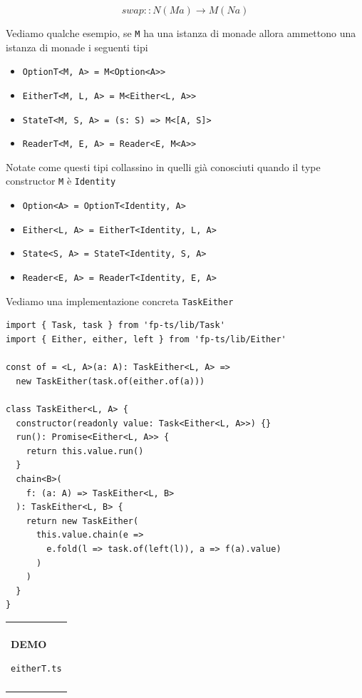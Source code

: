 \documentclass[12pt]{article}
\newenvironment{demo}
    {\begin{center}
    \begin{tabular}{|p{0.9\textwidth}|}
    \hline\\
    }
    {
    \\\\\hline
    \end{tabular}
    \end{center}
    }
\begin{document}
$$
swap :: N ( M a ) \rightarrow M ( N a )
$$

Vediamo qualche esempio, se \texttt{M} ha una istanza di monade allora ammettono una istanza di monade i seguenti tipi

\begin{itemize}
  \item \texttt{OptionT<M, A> = M<Option<A>>}
  \item \texttt{EitherT<M, L, A> = M<Either<L, A>>}
  \item \texttt{StateT<M, S, A> = (s: S) => M<[A, S]>}
  \item \texttt{ReaderT<M, E, A> = Reader<E, M<A>>}
\end{itemize}

Notate come questi tipi collassino in quelli già conosciuti quando il type constructor \texttt{M} è \texttt{Identity}

\begin{itemize}
  \item \texttt{Option<A> = OptionT<Identity, A>}
  \item \texttt{Either<L, A> = EitherT<Identity, L, A>}
  \item \texttt{State<S, A> = StateT<Identity, S, A>}
  \item \texttt{Reader<E, A> = ReaderT<Identity, E, A>}
\end{itemize}

Vediamo una implementazione concreta \texttt{TaskEither}

\begin{verbatim}
import { Task, task } from 'fp-ts/lib/Task'
import { Either, either, left } from 'fp-ts/lib/Either'

const of = <L, A>(a: A): TaskEither<L, A> =>
  new TaskEither(task.of(either.of(a)))

class TaskEither<L, A> {
  constructor(readonly value: Task<Either<L, A>>) {}
  run(): Promise<Either<L, A>> {
    return this.value.run()
  }
  chain<B>(
    f: (a: A) => TaskEither<L, B>
  ): TaskEither<L, B> {
    return new TaskEither(
      this.value.chain(e =>
        e.fold(l => task.of(left(l)), a => f(a).value)
      )
    )
  }
}
\end{verbatim}

\begin{demo}
\begin{center}
\textbf{DEMO}

\texttt{eitherT.ts}
\end{center}
\end{demo}
\end{document}
